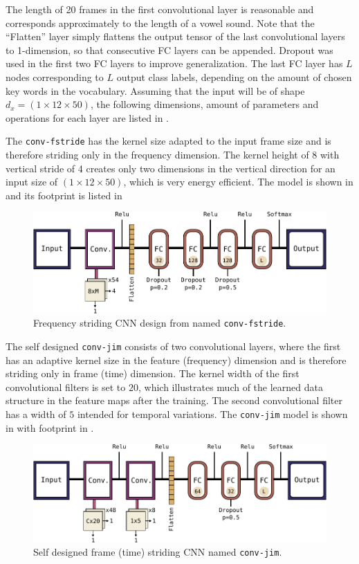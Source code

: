 The length of 20 frames in the first convolutional layer is reasonable and corresponds approximately to the length of a vowel sound.
Note that the \enquote{Flatten} layer simply flattens the output tensor of the last convolutional layers to 1-dimension, so that consecutive FC layers can be appended.
Dropout was used in the first two FC layers to improve generalization.
The last FC layer has $L$ nodes corresponding to $L$ output class labels, depending on the amount of chosen key words in the vocabulary.
Assuming that the input will be of shape $d_x = (1 \times 12 \times 50)$, the following dimensions, amount of parameters and operations for each layer are listed in .


The \texttt{conv-fstride} has the kernel size adapted to the input frame size and is therefore striding only in the frequency dimension.
The kernel height of 8 with vertical stride of 4 creates only two dimensions in the vertical direction for an input size of $(1 \times 12 \times 50)$, which is very energy efficient.
The model is shown in  and its footprint is listed in 
\begin{figure}[!ht]
  \centering
    \includegraphics[height=0.2\textwidth]{./4_nn/figs/nn_arch_cnn_fstride.pdf}
  \caption{Frequency striding CNN design from \cite{Sainath2015} named \texttt{conv-fstride}.}
  \label{fig:nn_arch_cnn_fstride}
\end{figure}
\FloatBarrier
\noindent


The self designed \texttt{conv-jim} consists of two convolutional layers, where the first has an adaptive kernel size in the feature (frequency) dimension and is therefore striding only in frame (time) dimension.
The kernel width of the first convolutional filters is set to $20$, which illustrates much of the learned data structure in the feature maps after the training.
The second convolutional filter has a width of $5$ intended for temporal variations.
The \texttt{conv-jim} model is shown in  with footprint in .
\begin{figure}[!ht]
  \centering
    \includegraphics[height=0.2\textwidth]{./4_nn/figs/nn_arch_cnn_jim.pdf}
  \caption{Self designed frame (time) striding CNN named \texttt{conv-jim}.}
  \label{fig:nn_arch_cnn_jim}
\end{figure}
\FloatBarrier
\noindent


